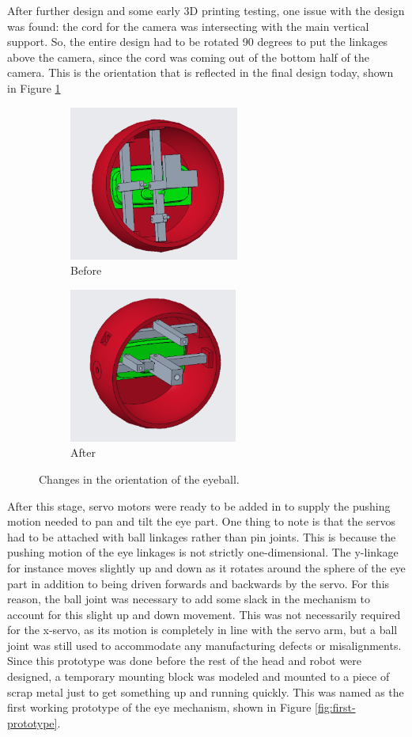 After further design and some early 3D printing testing, one issue with the design was found: the cord for the camera was intersecting with the main vertical support. So, the entire design had to be rotated 90 degrees to put the linkages above the camera, since the cord was coming out of the bottom half of the camera. This is the orientation that is reflected in the final design today, shown in Figure \ref{fig:iteration3}

\begin{figure}[h]
    \centering
    \begin{subfigure}{0.4\linewidth}
        \includegraphics[height=2in]{Thesis/ch2/iteration3.png}
        \caption{Before}
    \end{subfigure}
    \begin{subfigure}{0.4\linewidth}
        \includegraphics[height=2in]{Thesis/ch2/iteration3-2.png}
        \caption{After}
    \end{subfigure}
    \caption{Changes in the orientation of the eyeball.}
    \label{fig:iteration3}
\end{figure}


After this stage, servo motors were ready to be added in to supply the pushing motion needed to pan and tilt the eye part. One thing to note is that the servos had to be attached with ball linkages rather than pin joints. This is because the pushing motion of the eye linkages is not strictly one-dimensional. The y-linkage for instance moves slightly up and down as it rotates around the sphere of the eye part in addition to being driven forwards and backwards by the servo. For this reason, the ball joint was necessary to add some slack in the mechanism to account for this slight up and down movement. This was not necessarily required for the x-servo, as its motion is completely in line with the servo arm, but a ball joint was still used to accommodate any manufacturing defects or misalignments.
Since this prototype was done before the rest of the head and robot were designed, a temporary mounting block was modeled and mounted to a piece of scrap metal just to get something up and running quickly. This was named as the first working prototype of the eye mechanism, shown in Figure \ref{fig:first-prototype}.

